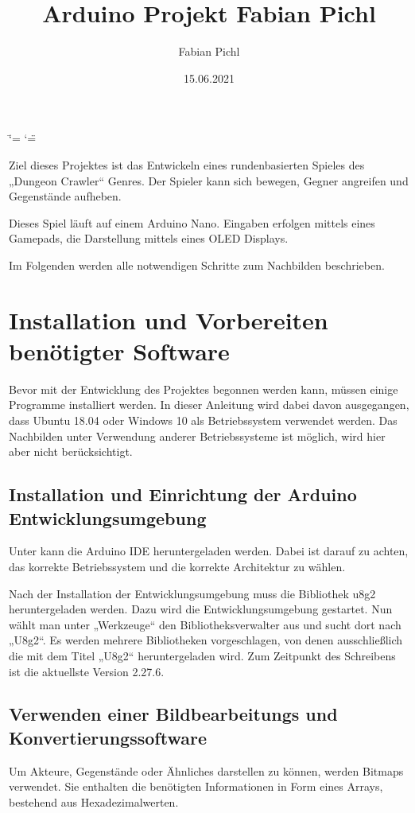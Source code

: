 \documentclass[letterpaper,10pt,ngerman]{sphinxmanual}
\title{Arduino Projekt Fabian Pichl}
\date{15.06.2021}
\author{Fabian Pichl}
\begin{document}
\ifdefined\shorthandoff
  \ifnum\catcode`\=\string=\active\shorthandoff{=}\fi
  \ifnum\catcode`\"=\active{}\fi
\fi

\pagestyle{empty}
\sphinxmaketitle
\pagestyle{plain}
\sphinxtableofcontents
\pagestyle{normal}
\label{\detokenize{index::doc}}


Ziel dieses Projektes ist das Entwickeln eines rundenbasierten Spieles des
„Dungeon Crawler“ Genres. Der Spieler kann sich bewegen, Gegner angreifen und
Gegenstände aufheben.

Dieses Spiel läuft auf einem Arduino Nano. Eingaben erfolgen mittels
eines Gamepads, die Darstellung mittels eines OLED Displays.

Im Folgenden werden alle notwendigen Schritte zum Nachbilden beschrieben.


\chapter{Installation und Vorbereiten benötigter Software}
\label{\detokenize{installation:installation-und-vorbereiten-benotigter-software}}\label{\detokenize{installation::doc}}
Bevor mit der Entwicklung des Projektes begonnen werden kann, müssen einige
Programme installiert werden. In dieser Anleitung wird dabei davon ausgegangen,
dass Ubuntu 18.04 oder Windows 10 als Betriebssystem verwendet werden. Das
Nachbilden unter Verwendung anderer Betriebssysteme ist möglich, wird hier aber
nicht berücksichtigt.


\section{Installation und Einrichtung der Arduino Entwicklungsumgebung}
\label{\detokenize{installation:installation-und-einrichtung-der-arduino-entwicklungsumgebung}}
Unter  kann die Arduino IDE heruntergeladen
werden. Dabei ist darauf zu achten, das korrekte Betriebssystem und die
korrekte Architektur zu wählen.

Nach der Installation der Entwicklungsumgebung muss die Bibliothek u8g2
heruntergeladen werden. Dazu wird die Entwicklungsumgebung gestartet. Nun wählt
man unter „Werkzeuge“ den Bibliotheksverwalter aus und sucht dort nach „U8g2“.
Es werden mehrere Bibliotheken vorgeschlagen, von denen ausschließlich die mit
dem Titel „U8g2“ heruntergeladen wird. Zum Zeitpunkt des Schreibens ist die
aktuellste Version 2.27.6.


\section{Verwenden einer Bildbearbeitungs\sphinxhyphen{} und Konvertierungssoftware}
\label{\detokenize{installation:verwenden-einer-bildbearbeitungs-und-konvertierungssoftware}}
Um Akteure, Gegenstände oder Ähnliches darstellen zu können, werden Bitmaps
verwendet. Sie enthalten die benötigten Informationen in Form eines Arrays,
bestehend aus Hexadezimalwerten.
\end{document}
